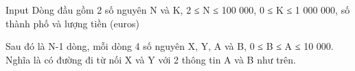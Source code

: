 Input
Dòng đầu gồm 2 số nguyên N và K, 2 ≤ N ≤ 100 000, 0 ≤ K ≤ 1 000 000, số thành phố và lượng tiền (euros)

Sau đó là N-1 dòng, mỗi dòng 4 số nguyên X, Y, A và B, 0 ≤ B ≤ A ≤ 10 000. Nghĩa là có đường đi từ nối X và Y với 2 thông tin A và B như trên.
